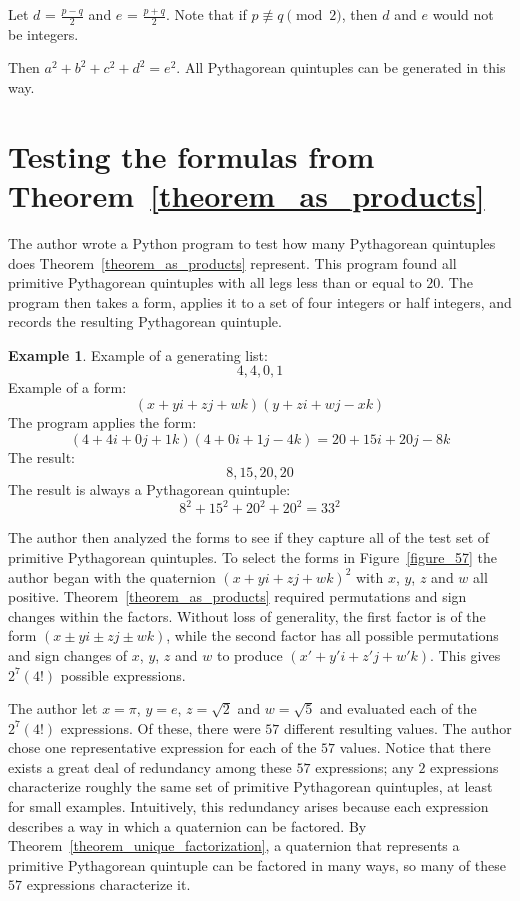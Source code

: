 \documentclass[12pt]{article}
\theoremstyle{definition}
\newtheorem{example}[theorem]{Example}
\numberwithin{equation}{section}
\begin{document}
\begin{appendices}
\begin{itemize}
\end{itemize}




Let $d$ = $\frac{p-q}{2}$ and
$e$ = $\frac{p+q}{2}$. 
Note that if $p \not\equiv q \pmod 2$, then $d$ and $e$
would not be integers.

Then $a^2 + b^2 + c^2 + d^2 = e^2$. All Pythagorean quintuples can 
be generated in this way.


\section{Testing the formulas from Theorem~\ref{theorem_as_products}}
\label{appendix_C}






The author wrote
a Python program
to test how many Pythagorean quintuples does Theorem~\ref{theorem_as_products}
represent.
This program found all primitive Pythagorean 
quintuples with all legs less than or equal to $20$.
The program then takes a form, applies it
to a set of four integers or half integers, and records the resulting 
Pythagorean quintuple.   


\begin{example}
Example of a generating list: 
$$ 4, 4, 0, 1
$$ 
Example of a form:
$$
     (x+yi+zj+wk)(y+zi+wj-xk)
$$
The program applies the form: 
$$
     (4+4i+0j+1k)(4+0i+1j-4k)=20+15i+20j-8k
$$
The result:
$$
       8, 15, 20, 20
$$
The result is always a Pythagorean quintuple: 
$$8^2+ 15^2+ 20^2+ 20^2= 33^2$$
\end{example}









The author then
analyzed the forms to
see if they
capture all of the test set of primitive Pythagorean quintuples.
To select the forms in Figure~\ref{figure_57}
the author began with the quaternion
$(x + yi + zj + wk)^2$ with 
 $x$, $y$, $z$ and $w$ all positive.
Theorem~\ref{theorem_as_products} required 
permutations and sign changes within the factors.
Without loss of generality, the first factor is
of the form $(x \pm yi \pm zj \pm wk)$,
while the second factor has all possible permutations
and sign changes of
 $x$, $y$, $z$ and $w$ to produce
$(x' + y'i + z'j + w'k)$.
This gives $2^7(4!)$ possible expressions.


The author let $x = \pi$, $y = e$,
$z = \sqrt{2}$ and $w = \sqrt{5}$ and evaluated
each of the $2^7(4!)$ expressions.
Of these, there were $57$ different resulting values.
The author chose one representative expression for each of the
$57$ values. Notice that there exists a great deal of 
redundancy among these $57$ expressions; any $2$ expressions
characterize roughly the same set of primitive
Pythagorean quintuples, at least for small examples. Intuitively,
this redundancy arises because each expression describes a way in which 
a quaternion can be factored. 
By Theorem~\ref{theorem_unique_factorization}, a quaternion that 
represents a primitive Pythagorean quintuple can be factored in many 
ways, so many of these $57$ expressions characterize it.



\end{appendices}
\end{document}

